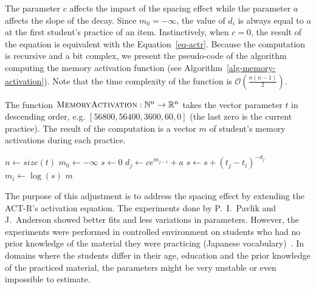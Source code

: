 The parameter $c$ affects the impact of the spacing effect while the parameter $a$ affects the slope of the decay. Since $m_0 = -\infty$, the value of $d_i$ is always equal to $a$ at the first student's practice of an item. Instinctively, when $c = 0$, the result of the equation is equivalent with the Equation~\ref{eq-actr}. Because the computation is recursive and a bit complex, we present the pseudo-code of the algorithm computing the memory activation function (see Algorithm~\ref{alg-memory-activation}). Note that the time complexity of the function is $\mathcal{O}\left(\frac{n(n-1)}{2}\right)$.

\begin{algorithm}
  \caption{The function $\textsc{MemoryActivation}: \mathbb{N}^n \rightarrow \mathbb{R}^n$ takes the vector parameter $t$ in descending order, e.g. $[56800, 56400, 3600, 60, 0]$ (the last zero is the current practice). The result of the computation is a vector $m$ of student's memory activations during each practice.}
  \label{alg-memory-activation}
  \begin{algorithmic}[1]
      \State $n \gets size(t)$
      \State $m_0 \gets -\infty$
        \State $s \gets 0$
          \State $d_j \gets ce^{m_{j-1}} + a$
          \State $s \gets s + (t_j - t_i)^{-d_j}$
        \EndFor
        \State $m_i \gets \log(s)$
      \EndFor
      \State \Return $m$
    \EndFunction
  \end{algorithmic}
\end{algorithm}

The purpose of this adjustment is to address the spacing effect by extending the ACT-R's activation equation. The experiments done by P.~I.~Pavlik and J.~Anderson showed better fits and less variations in parameters. However, the experiments were performed in controlled environment on students who had no prior knowledge of the material they were practicing (Japanese vocabulary)~\cite{Pavlik2005}. In domains where the students differ in their age, education and the prior knowledge of the practiced material, the parameters might be very unstable or even impossible to estimate.
